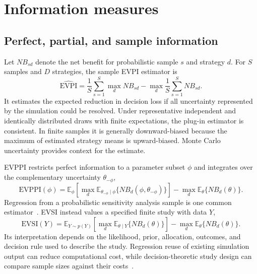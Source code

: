 \section{Information measures}

\subsection{Perfect, partial, and sample information}

Let $NB_{sd}$ denote the net benefit for probabilistic sample $s$ and strategy
$d$. For $S$ samples and $D$ strategies, the sample EVPI estimator is
\begin{equation}\label{eq:evpi}
  \widehat{\mathrm{EVPI}} =
  \frac{1}{S}\sum_{s=1}^{S}\max_{d} NB_{sd}
  - \max_{d}\frac{1}{S}\sum_{s=1}^{S} NB_{sd}.
\end{equation}
It estimates the expected reduction in decision loss if all uncertainty
represented by the simulation could be resolved. Under representative
independent and identically distributed draws with finite expectations, the
plug-in estimator is consistent. In finite samples it is generally
downward-biased because the maximum of estimated strategy means is
upward-biased. Monte Carlo uncertainty provides context for the estimate.

EVPPI restricts perfect information to a parameter subset $\phi$ and integrates
over the complementary uncertainty $\theta_{-\phi}$,
\begin{equation}\label{eq:evppi}
  \mathrm{EVPPI}(\phi) =
  \mathbb{E}_{\phi}\!\left[\max_d
  \mathbb{E}_{\theta_{-\phi}\mid\phi}
  \{NB_d(\phi,\theta_{-\phi})\}\right]
  - \max_d \mathbb{E}_{\theta}\{NB_d(\theta)\}.
\end{equation}
Regression from a probabilistic sensitivity analysis sample is one common
estimator~\cite{strong2014evppi}. EVSI instead values a specified finite study
with data $Y$,
\begin{equation}\label{eq:evsi}
  \mathrm{EVSI}(Y) =
  \mathbb{E}_{Y\sim p(Y)}\!\left[\max_d
  \mathbb{E}_{\theta\mid Y}\{NB_d(\theta)\}\right]
  - \max_d \mathbb{E}_{\theta}\{NB_d(\theta)\}.
\end{equation}
Its interpretation depends on the likelihood, prior, allocation, outcomes, and
decision rule used to describe the study. Regression reuse of existing
simulation output can reduce computational cost, while decision-theoretic
study design can compare sample sizes against their
costs~\cite{strong2015evsi,willan2005trial}.

